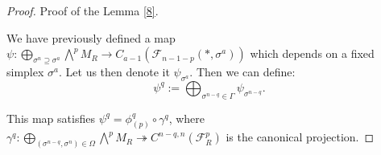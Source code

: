 \documentclass{article}
\begin{document}
\begin{proof}
    Proof of the Lemma \ref{8}.

    We have previously defined a map $\psi:\bigoplus_{\sigma^n\supseteq \sigma^a}\bigwedge^p M_R \rightarrow C_{a-1}(\mathcal{F}_{n-1-p}(*,\sigma^a))$ which depends on a fixed simplex $\sigma^a$. Let us then denote it $\psi_{\sigma^a}$. Then we can define:
    \begin{equation*}
        \psi^q:=\bigoplus_{\sigma^{n-q} \in \Gamma}\psi_{\sigma^{n-q}}.
    \end{equation*}

    This map satisfies $\psi^q = \phi^q_{(p)} \circ \gamma^q$, where $\gamma^q:\bigoplus_{(\sigma^{n-q},\sigma^n)\in\Omega}\bigwedge^p M_R \twoheadrightarrow C^{n-q,n}(\mathcal{F}^p_R)$ is the canonical projection.


\end{proof}
\end{document}
